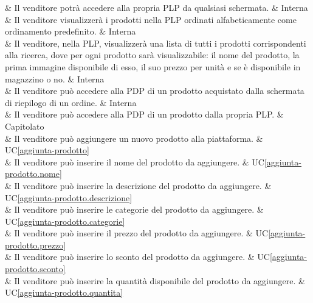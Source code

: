  & Il venditore potrà accedere alla propria PLP da qualsiasi schermata. & Interna \\

 & Il venditore visualizzerà i prodotti nella PLP ordinati alfabeticamente come ordinamento predefinito. & Interna \\

 & Il venditore, nella PLP, visualizzerà una lista di tutti i prodotti corrispondenti alla ricerca, dove per ogni prodotto sarà visualizzabile: il nome del prodotto, la prima immagine disponibile di esso, il suo prezzo per unità e se è disponibile in magazzino o no. & Interna \\

 & Il venditore può accedere alla PDP di un prodotto acquistato dalla schermata di riepilogo di un ordine. & Interna \\

 & Il venditore può accedere alla PDP di un prodotto dalla propria PLP. & Capitolato \\

 & Il venditore può aggiungere un nuovo prodotto alla piattaforma. & UC\ref{aggiunta-prodotto} \\
	
 & Il venditore può inserire il nome del prodotto da aggiungere. & UC\ref{aggiunta-prodotto.nome} \\
	
 & Il venditore può inserire la descrizione del prodotto da aggiungere. & UC\ref{aggiunta-prodotto.descrizione} \\
	
 & Il venditore può inserire le categorie del prodotto da aggiungere. & UC\ref{aggiunta-prodotto.categorie} \\
	
 & Il venditore può inserire il prezzo del prodotto da aggiungere. & UC\ref{aggiunta-prodotto.prezzo} \\
	
 & Il venditore può inserire lo sconto del prodotto da aggiungere. & UC\ref{aggiunta-prodotto.sconto} \\
	
 & Il venditore può inserire la quantità disponibile del prodotto da aggiungere. & UC\ref{aggiunta-prodotto.quantita} \\
	
